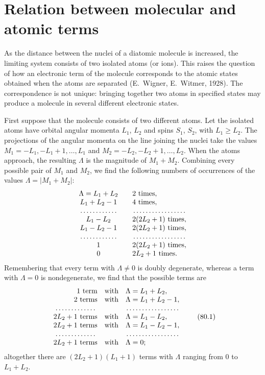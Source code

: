 \section{Relation between molecular and atomic terms}

As the distance between the nuclei of a diatomic molecule is increased, the limiting system consists of two isolated atoms (or ions). This raises the question of how an electronic term of the molecule corresponds to the atomic states obtained when the atoms are separated (E.~Wigner, E.~Witmer, 1928). The correspondence is not unique: bringing together two atoms in specified states may produce a molecule in several different electronic states.

First suppose that the molecule consists of two different atoms. Let the isolated atoms have orbital angular momenta $L_1$, $L_2$ and spins $S_1$, $S_2$, with $L_1\geqslant L_2$. The projections of the angular momenta on the line joining the nuclei take the values $M_1=-L_1,-L_1+1,\ldots,L_1$ and $M_2=-L_2,-L_2+1,\ldots,L_2$. When the atoms approach, the resulting $\Lambda$ is the magnitude of $M_1+M_2$. Combining every possible pair of $M_1$ and $M_2$, we find the following numbers of occurrences of the values $\Lambda=|M_1+M_2|$:
\[
\begin{array}{c@{\qquad}l}
\Lambda=L_1+L_2&2\text{ times},\\
L_1+L_2-1&4\text{ times},\\
\dotfill&\dotfill\\
L_1-L_2&2(2L_2+1)\text{ times},\\
L_1-L_2-1&2(2L_2+1)\text{ times},\\
\dotfill&\dotfill\\
1&2(2L_2+1)\text{ times},\\
0&2L_2+1\text{ times}.
\end{array}
\]
Remembering that every term with $\Lambda\ne0$ is doubly degenerate, whereas a term with $\Lambda=0$ is nondegenerate, we find that the possible terms are
\begin{equation}
\begin{array}{r@{\quad}c@{\quad}l}
1\text{ term}&\text{with}&\Lambda=L_1+L_2,\\
2\text{ terms}&\text{with}&\Lambda=L_1+L_2-1,\\
\dotfill&&\dotfill\\
2L_2+1\text{ terms}&\text{with}&\Lambda=L_1-L_2,\\
2L_2+1\text{ terms}&\text{with}&\Lambda=L_1-L_2-1,\\
\dotfill&&\dotfill\\
2L_2+1\text{ terms}&\text{with}&\Lambda=0;
\end{array}
\tag{80.1}
\end{equation}
altogether there are $(2L_2+1)(L_1+1)$ terms with $\Lambda$ ranging from 0 to $L_1+L_2$.

